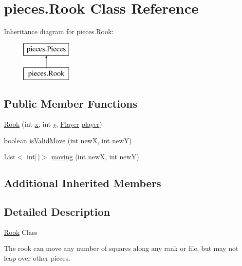 \hypertarget{classpieces_1_1_rook}{}\section{pieces.\+Rook Class Reference}
\label{classpieces_1_1_rook}
Inheritance diagram for pieces.\+Rook\+:\begin{figure}[H]
\begin{center}
\leavevmode
\includegraphics[height=2.000000cm]{classpieces_1_1_rook}
\end{center}
\end{figure}
\subsection*{Public Member Functions}
\begin{DoxyCompactItemize}
\item 
\mbox{\hyperlink{classpieces_1_1_rook_a9d77f8808929d292302628ad144b38a7}{Rook}} (int \mbox{\hyperlink{classpieces_1_1_pieces_ac5178f9b8a6b0c4235851475081249f3}{x}}, int \mbox{\hyperlink{classpieces_1_1_pieces_a66d911734967a8ced1b9792fe900fadb}{y}}, \mbox{\hyperlink{classgame_1_1_player}{Player}} \mbox{\hyperlink{classpieces_1_1_pieces_a49f35044dd36e5c4b04261a8ea54ad0c}{player}})
\item 
boolean \mbox{\hyperlink{classpieces_1_1_rook_a7c4ba4f45c9884e16b68e66521bbefb5}{is\+Valid\+Move}} (int newX, int newY)
\item 
List$<$ int\mbox{[}$\,$\mbox{]}$>$ \mbox{\hyperlink{classpieces_1_1_rook_a45ac73bc8b0a1b8efac9ec3b6398bb2c}{moving}} (int newX, int newY)
\end{DoxyCompactItemize}
\subsection*{Additional Inherited Members}


\subsection{Detailed Description}
\mbox{\hyperlink{classpieces_1_1_rook}{Rook}} Class 

The rook can move any number of squares along any rank or file, but may not leap over other pieces. 

